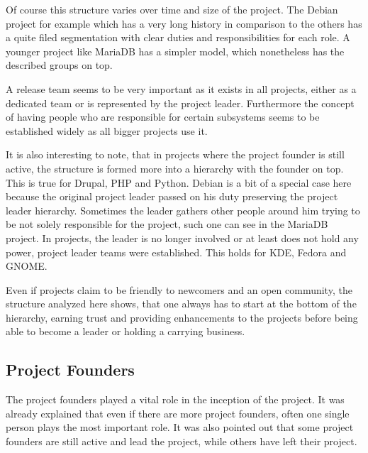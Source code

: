 Of course this structure varies over time and size of the project. The Debian
project for example which has a very long history in comparison to the others
has a quite filed segmentation with clear duties and responsibilities for each
role. A younger project like MariaDB has a simpler model, which nonetheless
has the described groups on top.

A release team seems to be very important as it exists in all projects, either
as a dedicated team or is represented by the project leader. Furthermore the
concept of having people who are responsible for certain subsystems seems to be
established widely as all bigger projects use it.

It is also interesting to note, that in projects where the project founder is
still active, the structure is formed more into a hierarchy with the founder on
top. This is true for Drupal, PHP and Python. Debian is a bit of a special case
here because the original project leader passed on his duty preserving the
project leader hierarchy. Sometimes the leader gathers other people around him
trying to be not solely responsible for the project, such one can see in the
MariaDB project. In projects, the leader is no longer involved or at least does
not hold any power, project leader teams were established. This holds for KDE,
Fedora and GNOME.

Even if projects claim to be friendly to newcomers and an open community, the
structure analyzed here shows, that one always has to start at the bottom of
the hierarchy, earning trust and providing enhancements to the projects before
being able to become a leader or holding a carrying business. 


\subsection{Project Founders} %

The project founders played a vital role in the inception of the project. It
was already explained that even if there are more project founders, often one
single person plays the most important role. It was also pointed out that some
project founders are still active and lead the project, while others have left
their project.

